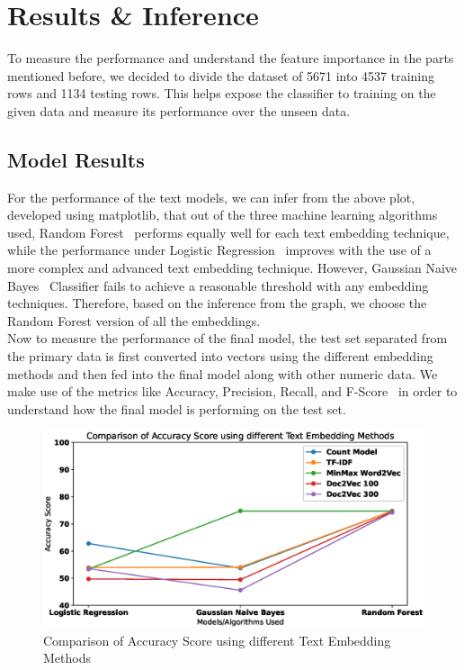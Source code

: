 \documentclass[runningheads]{llncs}
\begin{document}
\section{Results \& Inference}
 To measure the performance and understand the feature importance in the parts mentioned before, we decided to divide the dataset of 5671 into 4537 training rows and 1134 testing rows. This helps expose the classifier to training on the given data and measure its performance over the unseen data.
\subsection{Model Results}
For the performance of the text models, we can infer from the above plot, developed using matplotlib, that out of the three machine learning algorithms used, Random Forest~\cite{rf} performs equally well for each text embedding technique, while the performance under Logistic Regression~\cite{lr} improves with the use of a more complex and advanced text embedding technique. However, Gaussian Naive Bayes~\cite{nb} Classifier fails to achieve a reasonable threshold with any embedding techniques. Therefore, based on the inference from the graph, we choose the Random Forest version of all the embeddings.\\
Now to measure the performance of the final model, the test set separated from the primary data is first converted into vectors using the different embedding methods and then fed into the final model along with other numeric data. We make use of the metrics like Accuracy, Precision, Recall, and F-Score~\cite{metrics} in order to understand how the final model is performing on the test set.
\begin{figure}
    \includegraphics[width=\linewidth]{AccScoreTextModel.eps}
    \caption{Comparison of Accuracy Score using different Text Embedding Methods} \label{fig2}
\end{figure}
\end{document}
